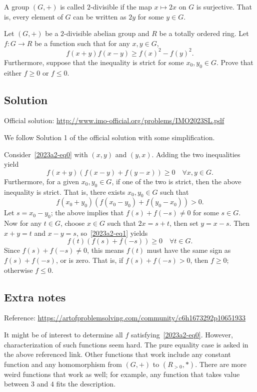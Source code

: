 A group $(G, +)$ is called $2$-divisible if the map $x \mapsto 2x$ on $G$ is surjective.
That is, every element of $G$ can be written as $2y$ for some $y \in G$.

Let $(G, +)$ be a $2$-divisible abelian group and $R$ be a totally ordered ring.
Let $f : G \to R$ be a function such that for any $x, y \in G$,
\[ f(x + y) f(x - y) \geq f(x)^2 - f(y)^2. \tag{*}\label{2023a2-eq0} \]
Furthermore, suppose that the inequality is strict for some $x_0, y_0 \in G$.
Prove that either $f \geq 0$ or $f \leq 0$.



\subsection*{Solution}

Official solution: \url{http://www.imo-official.org/problems/IMO2023SL.pdf}

We follow Solution 1 of the official solution with some simplification.

Consider~\eqref{2023a2-eq0} with $(x, y)$ and $(y, x)$.
Adding the two inequalities yield
\[ f(x + y) (f(x - y) + f(y - x)) \geq 0 \quad \forall x, y \in G. \tag{*}\label{2023a2-eq1} \]
Furthermore, for a given $x_0, y_0 \in G$, if one of the two is strict, then the above inequality is strict.
That is, there exists $x_0, y_0 \in G$ such that
\[ f(x_0 + y_0) (f(x_0 - y_0) + f(y_0 - x_0)) > 0. \]
Let $s = x_0 - y_0$; the above implies that $f(s) + f(-s) \neq 0$ for some $s \in G$.
Now for any $t \in G$, choose $x \in G$ such that $2x = s + t$, then set $y = x - s$.
Then $x + y = t$ and $x - y = s$, so~\eqref{2023a2-eq1} yields
\[ f(t) (f(s) + f(-s)) \geq 0 \quad \forall t \in G. \]
Since $f(s) + f(-s) \neq 0$, this means $f(t)$ must have the same sign as $f(s) + f(-s)$, or is zero.
That is, if $f(s) + f(-s) > 0$, then $f \geq 0$; otherwise $f \leq 0$.



\subsection*{Extra notes}

Reference: \url{https://artofproblemsolving.com/community/c6h1673292p10651933}

It might be of interest to determine all $f$ satisfying~\eqref{2023a2-eq0}.
However, characterization of such functions seem hard.
The pure equality case is asked in the above referenced link.
Other functions that work include any constant function and any homomorphism from $(G, +)$ to $(R_{>0}, *)$.
There are more weird functions that work as well; for example, any function that takes value between $3$ and $4$ fits the description.
